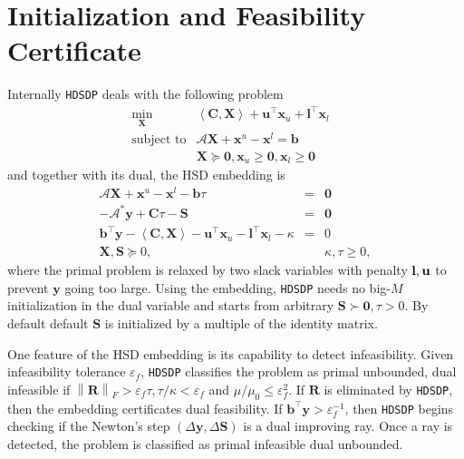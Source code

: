 \documentclass[10pt]{article}
\begin{document}
{\section{Initialization and Feasibility Certificate} \label{sec4}

Internally {{\texttt{HDSDP}}} deals with the following problem
\begin{eqnarray*}
  \min_{\mathbf{X}} & \left\langle \mathbf{C}, \mathbf{X} \right\rangle + \mathbf{u}^{\top} \mathbf{x}_u +
  \mathbf{l}^{\top} \mathbf{x}_l & \\
  \text{subject to} & \mathcal{A} \mathbf{X} + \mathbf{x}^u - \mathbf{x}^l = \mathbf{b} & \\
  & \mathbf{X} \succeq \textbf{0}, \mathbf{x}_u \geq \textbf{0}, \mathbf{x}_l \geq \textbf{0} & 
\end{eqnarray*}
and together with its dual, the HSD embedding is
\begin{eqnarray*}
  \mathcal{A} \mathbf{X} + \mathbf{x}^u - \mathbf{x}^l - \mathbf{b} \tau & = & \textbf{0}\\
  - \mathcal{A}^{\ast} \mathbf{y} + \mathbf{C} \tau - \mathbf{S} & = & \textbf{0}\\
  \mathbf{b}^{\top} \mathbf{y} - \left\langle \mathbf{C}, \mathbf{X} \right\rangle - \mathbf{u}^{\top} \mathbf{x}_u -
  \mathbf{l}^{\top} \mathbf{x}_l - \kappa & = & 0\\
  \mathbf{X}, \mathbf{S} \succeq 0, &  & \kappa, \tau \geq 0,
\end{eqnarray*}
where the primal problem is relaxed by two slack variables with penalty
$\textbf{{\textbf{l}}}, \mathbf{u}$ to prevent $\mathbf{y}$ going too large. Using the embedding, 
{{\texttt{HDSDP}}} needs no big-$M$ initialization
in the dual variable and starts from arbitrary $\mathbf{S} \succ \textbf{0}, \tau > 0$. By default
default $\mathbf{S}$ is initialized by a multiple of the identity matrix.

One feature of the HSD embedding is its capability to
detect infeasibility. Given infeasibility tolerance $\varepsilon_f$, {{\texttt{HDSDP}}}
classifies the problem as primal unbounded, dual infeasible if $\left\| \mathbf{R}
\right\|_F > \varepsilon_f \tau, \tau / \kappa < \varepsilon_f$ and $\mu /
\mu_0 \leq \varepsilon_f^2$. If $\mathbf{R}$ is eliminated by {{\texttt{HDSDP}}}, then
the embedding certificates dual feasibility. If $\mathbf{b}^{\top} \mathbf{y} >
\varepsilon_f^{- 1}$, then {{\texttt{HDSDP}}} begins checking if the Newton's
step $\left( \Delta \mathbf{y}, \Delta \mathbf{S} \right)$ is a dual improving ray. Once a ray is detected, the problem is classified as primal
infeasible dual unbounded.

}
\end{document}
